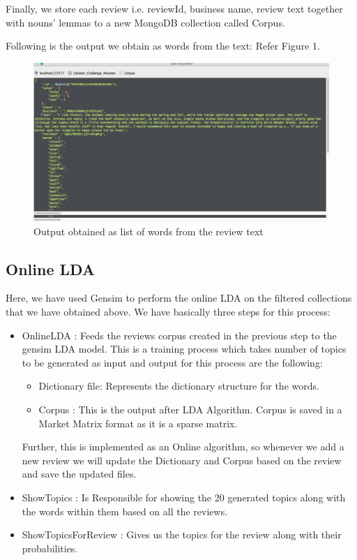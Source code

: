 \documentclass[12pt]{article} %
\begin{document}
Finally, we store each review i.e. reviewId, business name, review text  together with nouns' lemmas to a new MongoDB collection called Corpus.

Following is the output we obtain as words from the text: Refer Figure 1.

\begin{figure}[h]
\begin{center}
\includegraphics[width=6.5in]{data2.png}
\caption{Output obtained as list of words from the review text}
\end{center}
\end{figure}

\subsection{Online LDA}

Here, we have used Gensim to perform the online LDA on the filtered collections that we have obtained above. We have basically three steps for this process:

\begin{itemize}
\item OnlineLDA : Feeds the reviews corpus created in the previous step to the gensim LDA model. This is a training process which takes number of topics to be generated as input and output for this process are the following:

	\begin{itemize}
	\item Dictionary file: Represents the dictionary structure for the words.
	\item Corpus : This is the output after LDA Algorithm. Corpus is saved in a Market Matrix format as it is a sparse matrix.
	\end{itemize}
	
Further, this is implemented as an Online algorithm, so whenever we add a new review we will update the Dictionary and Corpus based on the review and save the updated files.

\item ShowTopics : Is Responsible for showing the 20 generated topics along with the words within them based on all the reviews.

\item ShowTopicsForReview : Gives us the topics for the review along with their probabilities.

\end{itemize}
\end{document}
